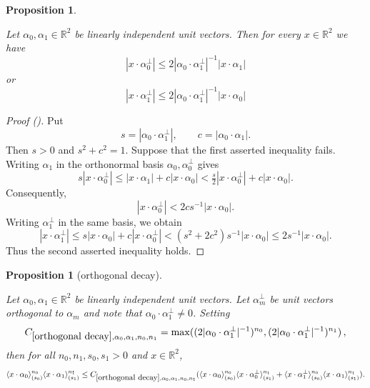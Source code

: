 \documentclass[12pt,reqno]{amsart}
\newcommand{\auto}{{({\tiny\faCar})}}
\theoremstyle{plain}
\newtheorem{proposition}[theorem]{Proposition}
\numberwithin{equation}{section}
\theoremstyle{remark}
\newcommand{\uses}[1]{}
\newcommand{\usesdefs}[1]{}
\newcommand{\leanok}{}
\newcommand{\lean}[1]{}
\newcommand{\R}{{\mathbb R}}
\begin{document}
\begin{proposition}\label{orthogonal domination}\uses{}\usesdefs{}
\lean{Auto.orthogonalDomination}
\leanok
Let     $\alpha_0 ,\alpha_1\in\mathbb{R}^2$ be linearly independent unit vectors.
Then for every $x\in \R^2$ we have
 \begin{equation}\label{auto:orthogonal-coordinate-first-bound}
     |x\cdot \alpha_0^\perp|\le  2|\alpha_0\cdot \alpha_1^\perp|^{-1}| x\cdot \alpha_1|
 \end{equation}
or
 \begin{equation}\label{auto:orthogonal-coordinate-second-bound}
     | x\cdot \alpha_1^\perp|\le   2| \alpha_0\cdot \alpha_1^\perp|^{-1}|x\cdot \alpha_0|
 \end{equation}
\end{proposition}
\begin{proof}[Proof \auto]
Put
\[
s=|\alpha_0\cdot\alpha_1^\perp|,
\qquad
c=|\alpha_0\cdot\alpha_1|.
\]
Then $s>0$ and $s^2+c^2=1$. Suppose that the first asserted inequality fails. Writing $\alpha_1$ in the orthonormal basis $\alpha_0,\alpha_0^\perp$ gives
\[
s|x\cdot\alpha_0^\perp|
\le |x\cdot\alpha_1|+c|x\cdot\alpha_0|
<\tfrac{s}{2}|x\cdot\alpha_0^\perp|+c|x\cdot\alpha_0|.
\]
Consequently,
\[
|x\cdot\alpha_0^\perp|<2cs^{-1}|x\cdot\alpha_0|.
\]
Writing $\alpha_1^\perp$ in the same basis, we obtain
\[
|x\cdot\alpha_1^\perp|
\le s|x\cdot\alpha_0|+c|x\cdot\alpha_0^\perp|
<(s^2+2c^2)s^{-1}|x\cdot\alpha_0|
\le2s^{-1}|x\cdot\alpha_0|.
\]
Thus the second asserted inequality holds.
\end{proof}
\begin{proposition}[orthogonal decay]\label{orthogonal decay}\uses{compare brackets,orthogonal domination}\usesdefs{bracket bump}
\lean{Auto.orthogonalDecay}
\leanok
Let $\alpha_0,\alpha_1\in\mathbb{R}^2$ be linearly independent unit vectors.
Let $\alpha_{m}^\perp$ be unit vectors orthogonal to $\alpha_m$ and note that $\alpha_0\cdot \alpha_1^\perp\neq 0$. Setting \begin{equation}\label{auto:orthogonal-decay-constant}
    C_{\ref{orthogonal decay}, \alpha_0,\alpha_1,n_0,n_1}=\max( (2 |\alpha_0\cdot \alpha_1^\perp|^{-1})^{n_0},(2 |\alpha_0\cdot \alpha_1^\perp|^{-1})^{n_1}) \, ,
\end{equation}
then for all $n_0,n_1,s_0,s_1>0$ and $x\in\mathbb{R}^2$,
\begin{equation}\label{eq:two bump}
    \langle x\cdot \alpha_0\rangle_{(s_0)}^{n_0} \langle x\cdot \alpha_1\rangle_{(s_1)}^{n_1}
\le C_{\ref{orthogonal decay},\alpha_0,\alpha_1,n_0,n_1} (\langle x\cdot \alpha_0\rangle_{(s_0)}^{n_0} \langle x\cdot \alpha_0^\perp\rangle_{(s_1)}^{n_1} +
\langle x\cdot \alpha_1^\perp\rangle_{(s_0)}^{n_0} \langle x\cdot \alpha_1\rangle_{(s_1)}^{n_1}).
\end{equation}
\end{proposition}
\end{document}
